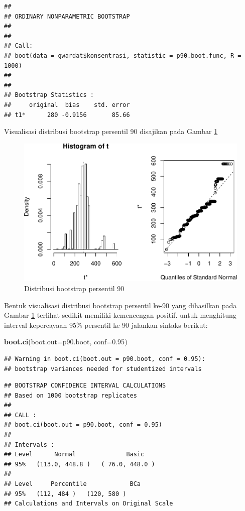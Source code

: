 \documentclass[]{book}
\newenvironment{Shaded}{\begin{snugshade}}{\end{snugshade}}
\newcommand{\KeywordTok}[1]{\textcolor[rgb]{0.13,0.29,0.53}{\textbf{#1}}}
\newcommand{\DataTypeTok}[1]{\textcolor[rgb]{0.13,0.29,0.53}{#1}}
\newcommand{\FloatTok}[1]{\textcolor[rgb]{0.00,0.00,0.81}{#1}}
\newcommand{\NormalTok}[1]{#1}
\begin{document}
\begin{verbatim}
## 
## ORDINARY NONPARAMETRIC BOOTSTRAP
## 
## 
## Call:
## boot(data = gwardat$konsentrasi, statistic = p90.boot.func, R = 1000)
## 
## 
## Bootstrap Statistics :
##     original  bias    std. error
## t1*      280 -0.9156       85.66
\end{verbatim}

Visualisasi distribusi bootstrap persentil 90 disajikan pada Gambar
\ref{fig:boot3}

\begin{figure}

{\centering \includegraphics[width=0.65\linewidth]{EnvStat_files/figure-latex/boot3-1} 

}

\caption{Distribusi bootstrap persentil 90}\label{fig:boot3}
\end{figure}

Bentuk visualisasi distribusi bootstrap persentil ke-90 yang dihasilkan
pada Gambar \ref{fig:boot3} terlihat sedikit memiliki kemencengan
positif. untuk menghitung interval kepercayaan 95\% persentil ke-90
jalankan sintaks berikut:

\begin{Shaded}
\begin{Highlighting}[]
\KeywordTok{boot.ci}\NormalTok{(}\DataTypeTok{boot.out=}\NormalTok{p90.boot, }\DataTypeTok{conf=}\FloatTok{0.95}\NormalTok{)}
\end{Highlighting}
\end{Shaded}

\begin{verbatim}
## Warning in boot.ci(boot.out = p90.boot, conf = 0.95):
## bootstrap variances needed for studentized intervals
\end{verbatim}

\begin{verbatim}
## BOOTSTRAP CONFIDENCE INTERVAL CALCULATIONS
## Based on 1000 bootstrap replicates
## 
## CALL : 
## boot.ci(boot.out = p90.boot, conf = 0.95)
## 
## Intervals : 
## Level      Normal              Basic         
## 95%   (113.0, 448.8 )   ( 76.0, 448.0 )  
## 
## Level     Percentile            BCa          
## 95%   (112, 484 )   (120, 580 )  
## Calculations and Intervals on Original Scale
\end{verbatim}
\end{document}
